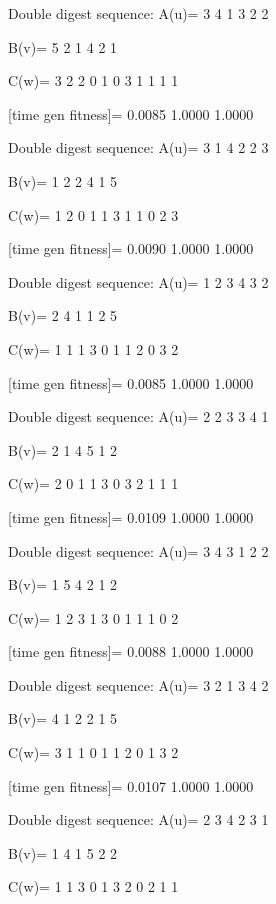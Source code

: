 Double digest sequence:
A(u)=
     3     4     1     3     2     2

B(v)=
     5     2     1     4     2     1

C(w)=
     3     2     2     0     1     0     3     1     1     1     1

[time gen fitness]=
    0.0085    1.0000    1.0000

Double digest sequence:
A(u)=
     3     1     4     2     2     3

B(v)=
     1     2     2     4     1     5

C(w)=
     1     2     0     1     1     3     1     1     0     2     3

[time gen fitness]=
    0.0090    1.0000    1.0000

Double digest sequence:
A(u)=
     1     2     3     4     3     2

B(v)=
     2     4     1     1     2     5

C(w)=
     1     1     1     3     0     1     1     2     0     3     2

[time gen fitness]=
    0.0085    1.0000    1.0000

Double digest sequence:
A(u)=
     2     2     3     3     4     1

B(v)=
     2     1     4     5     1     2

C(w)=
     2     0     1     1     3     0     3     2     1     1     1

[time gen fitness]=
    0.0109    1.0000    1.0000

Double digest sequence:
A(u)=
     3     4     3     1     2     2

B(v)=
     1     5     4     2     1     2

C(w)=
     1     2     3     1     3     0     1     1     1     0     2

[time gen fitness]=
    0.0088    1.0000    1.0000

Double digest sequence:
A(u)=
     3     2     1     3     4     2

B(v)=
     4     1     2     2     1     5

C(w)=
     3     1     1     0     1     1     2     0     1     3     2

[time gen fitness]=
    0.0107    1.0000    1.0000

Double digest sequence:
A(u)=
     2     3     4     2     3     1

B(v)=
     1     4     1     5     2     2

C(w)=
     1     1     3     0     1     3     2     0     2     1     1

